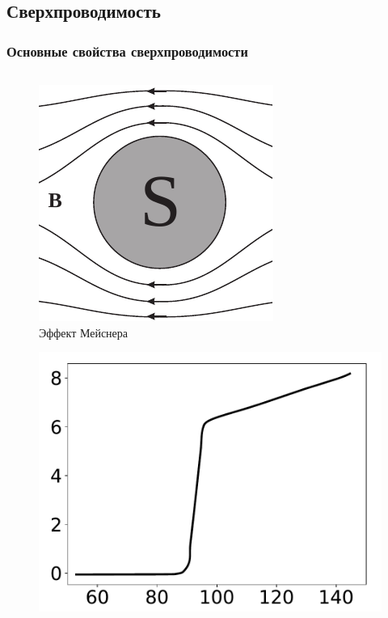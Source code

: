 \subsection{Сверхпроводимость}
\begin{frame}[t]%
	\frametitle{Основные свойства сверхпроводимости}
	\vspace{-1.5em}
	\begin{columns}
		\begin{column}{0.49\textwidth}%
			\begin{figure}[h]
				\includegraphics[width=0.5\linewidth]{img/messner}
				\caption{Эффект Мейснера}
			\end{figure}
			\vspace{-2em}
			\begin{figure}[h]
				\includegraphics[width=0.8\linewidth]{pic/rt2}
				\vspace{-0.5em}

\end{figure}
\end{column}
\end{columns}
\end{frame}
